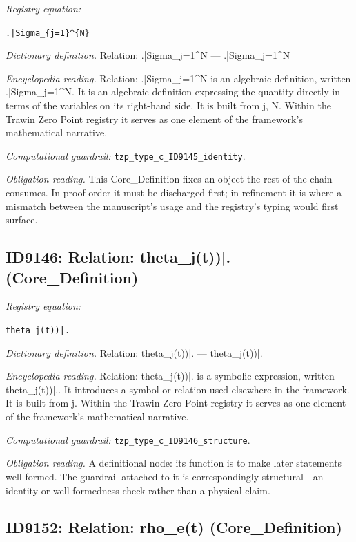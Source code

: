 \documentclass[11pt]{article}
\theoremstyle{remark}
\begin{document}
\noindent\textit{Registry equation:}\par
{\small\texttt{.|Sigma\_\{j=1\}\textasciicircum{}\{N\}}}\par\medskip
\noindent\textit{Dictionary definition.} Relation: .|Sigma\_j=1\textasciicircum{}N --- .|Sigma\_j=1\textasciicircum{}N\par\medskip
\noindent\textit{Encyclopedia reading.} Relation: .|Sigma\_j=1\textasciicircum{}N is an algebraic definition, written .|Sigma\_j=1\textasciicircum{}N. It is an algebraic definition expressing the quantity directly in terms of the variables on its right-hand side. It is built from j, N. Within the Trawin Zero Point registry it serves as one element of the framework's mathematical narrative.
\par\medskip\noindent\textit{Computational guardrail:} \texttt{tzp\_type\_c\_ID9145\_identity}.
\par\medskip\noindent\textit{Obligation reading.} This Core\_Definition fixes an object the rest of the chain consumes. In proof order it must be discharged first; in refinement it is where a mismatch between the manuscript's usage and the registry's typing would first surface.

\subsection{ID9146: Relation: theta\_j(t))|. (Core\_Definition)}

\noindent\textit{Registry equation:}\par
{\small\texttt{theta\_j(t))|.}}\par\medskip
\noindent\textit{Dictionary definition.} Relation: theta\_j(t))|. --- theta\_j(t))|.\par\medskip
\noindent\textit{Encyclopedia reading.} Relation: theta\_j(t))|. is a symbolic expression, written theta\_j(t))|.. It introduces a symbol or relation used elsewhere in the framework. It is built from j. Within the Trawin Zero Point registry it serves as one element of the framework's mathematical narrative.
\par\medskip\noindent\textit{Computational guardrail:} \texttt{tzp\_type\_c\_ID9146\_structure}.
\par\medskip\noindent\textit{Obligation reading.} A definitional node: its function is to make later statements well-formed. The guardrail attached to it is correspondingly structural---an identity or well-formedness check rather than a physical claim.

\subsection{ID9152: Relation: rho\_e(t) (Core\_Definition)}
\end{document}

